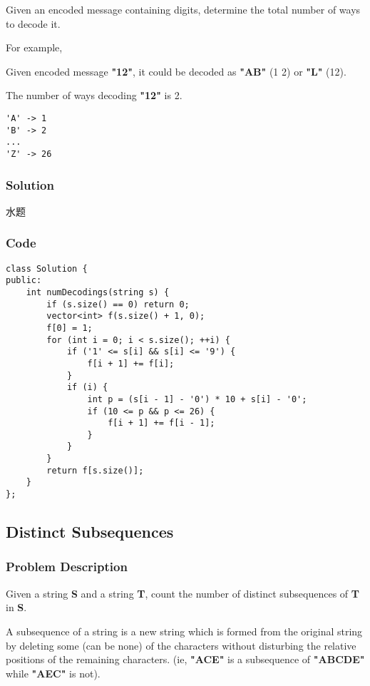 \documentclass[courier]{article}
\begin{document}
\begin{CJK*}{UTF8}{gkai}
Given an encoded message containing digits, determine the total number of ways to decode it.

For example,


Given encoded message \textbf{"12"},
it could be decoded as \textbf{"AB"} (1 2) or \textbf{"L"} (12).

The number of ways decoding \textbf{"12"} is 2.

\begin{verbatim}
'A' -> 1
'B' -> 2
...
'Z' -> 26
\end{verbatim}


\subsubsection*{Solution}
水题

\subsubsection*{Code}
\begin{lstlisting}
class Solution {
public:
    int numDecodings(string s) {
        if (s.size() == 0) return 0;
        vector<int> f(s.size() + 1, 0);
        f[0] = 1;
        for (int i = 0; i < s.size(); ++i) {
            if ('1' <= s[i] && s[i] <= '9') {
                f[i + 1] += f[i];
            }
            if (i) {
                int p = (s[i - 1] - '0') * 10 + s[i] - '0';
                if (10 <= p && p <= 26) {
                    f[i + 1] += f[i - 1];
                }
            }
        }
        return f[s.size()];
    }
}; 
\end{lstlisting}


\subsection{ Distinct Subsequences }

\subsubsection*{Problem Description}
Given a string \textbf{S} and a string \textbf{T}, count the number of distinct subsequences of \textbf{T} in \textbf{S}.

A subsequence of a string is a new string which is formed from the original string by deleting some (can be none) of the characters without disturbing the relative positions of the remaining characters. (ie, \textbf{"ACE"} is a subsequence of \textbf{"ABCDE"} while \textbf{"AEC"} is not).


\end{CJK*}
\end{document}

